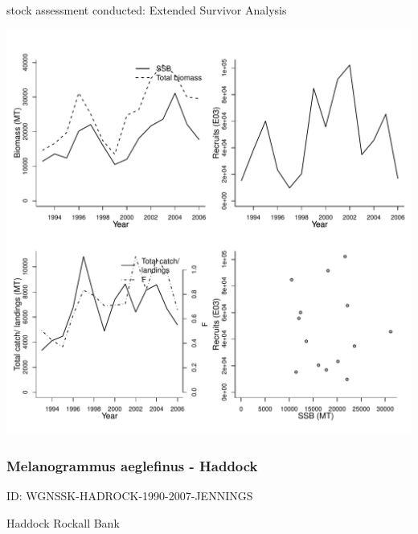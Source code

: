 stock assessment conducted: Extended Survivor Analysis 
\begin{center}
\vspace{-0.2cm}\includegraphics[scale=0.65]{../tex/figures/plot-WGSSDS-HADVIIb-k-1993-2006-JENNINGS.pdf}
\end{center}

\newpage
\subsubsection{Melanogrammus aeglefinus - Haddock}
ID: WGNSSK-HADROCK-1990-2007-JENNINGS

Haddock Rockall Bank 

